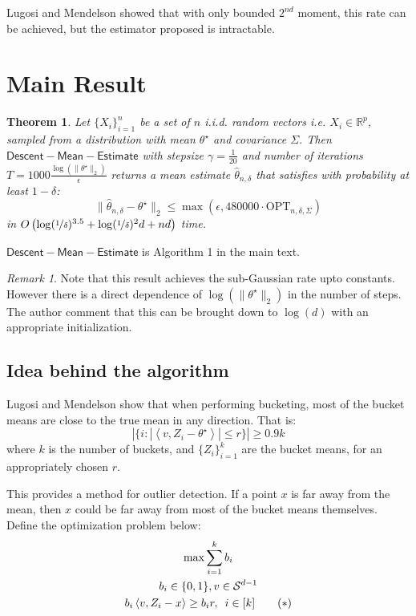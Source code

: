 \documentclass{article}
\newtheorem{theorem}{Theorem}
\theoremstyle{remark}
\newtheorem*{remark}{Remark}
\theoremstyle{defintiion}
\newcommand{\real}{\mathbb{R}}
\newcommand{\inner}[2]{\left\langle #1, #2 \right\rangle}
\newcommand{\OPT}{\mathrm{OPT}}
\newcommand{\eparam}{\widehat{\theta}}
\newcommand{\tparam}{\theta^{\star}}
\newcommand{\calS}{\mathcal{S}}
\begin{document}
Lugosi and Mendelson showed that with only bounded \(2^{nd}\) moment, this rate can be achieved, but the estimator proposed is intractable.

\section{Main Result}
\begin{theorem}
Let \(\{X_{i}\}_{i=1}^{n}\) be a set of \(n\) i.i.d. random vectors i.e. \(X_{i} \in \real^{p}\), sampled from a distribution with mean \(\tparam\) and covariance \(\Sigma\). Then \(\mathsf{Descent-Mean-Estimate}\) with stepsize \(\gamma = \frac{1}{20}\) and number of iterations \(T = 1000\frac{\log(\|\tparam\|_{2})}{\epsilon}\) returns a mean estimate \(\eparam_{n, \delta}\) that satisfies with probability at least \(1 - \delta\):
\begin{equation*}
\|\eparam_{n, \delta} - \tparam\|_{2} \leq \max\left(\epsilon, 480000 \cdot \OPT_{n, \delta, \Sigma}\right)
\end{equation*}
in \(O\left(\log(\nicefrac{1}{\delta})^{3.5} + \log(\nicefrac{1}{\delta})^{2}d + nd\right)\) time.
\end{theorem}

\(\mathsf{Descent-Mean-Estimate}\) is Algorithm 1 in the main text.

\begin{remark}
Note that this result achieves the sub-Gaussian rate upto constants. However there is a direct dependence of \(\log(\|\tparam\|_{2})\) in the number of steps. The author comment that this can be brought down to \(\log(d)\) with an appropriate initialization.
\end{remark}

\subsection{Idea behind the algorithm}
Lugosi and Mendelson show that when performing bucketing, most of the bucket means are close to the true mean in any direction. That is:
\begin{equation}
\label{eqn:lm-condition}
\left|\{i : |\inner{v}{Z_{i} - \tparam}| \leq r\}\right| \geq 0.9k
\end{equation}
where \(k\) is the number of buckets, and \(\{Z_{i}\}_{i=1}^{k}\) are the bucket means, for an appropriately chosen \(r\).

This provides a method for outlier detection. If a point \(x\) is far away from the mean, then \(x\) could be far away from most of the bucket means themselves. Define the optimization problem below:
\begin{gather*}
\max \sum_{i=1}^{k} b_{i} \\
b_{i} \in \{0, 1\}, v \in \calS^{d-1} \\
b_{i}\inner{v}{Z_{i} - x} \geq b_{i}r, \enskip i \in [k] \qquad (*)
\end{gather*}
\end{document}
